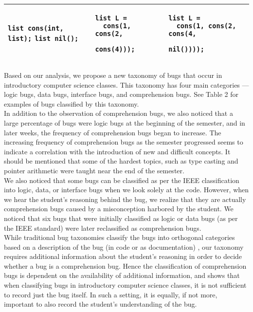 \documentclass{sig-alternate}
\begin{document}
\begin{table*}
\begin{tabular}{|p{0.95in}|p{1.6in}|p{2in}|p{2.1in}|}
\verb|list cons(int, list);|
\verb|list nil();|
& 
\begin{verbatim}
list L = 
  cons(1, cons(2, 
              cons(4)));
\end{verbatim}
& 
\begin{verbatim}
list L = 
  cons(1, cons(2, cons(4, 
                  nil())));
\end{verbatim}
\\ \hline
\end{tabular}
\end{table*}

Based on our analysis, we propose a new taxonomy of bugs that occur in introductory computer science classes. This taxonomy has four main categories --- logic bugs, data bugs, interface bugs, and comprehension bugs. See Table 2 for examples of bugs classified by this taxonomy.\\

In addition to the observation of comprehension bugs, we also noticed that a large percentage of bugs were logic bugs at the beginning of the semester, and in later weeks, the frequency of comprehension bugs began to increase. The increasing frequency of comprehension bugs as the semester progressed seems to indicate a correlation with the introduction of new and difficult concepts. It should be mentioned that some of the hardest topics, such as type casting and pointer arithmetic were taught near the end of the semester.\\

We also noticed that some bugs can be classified as per the IEEE classification into logic, data, or interface bugs when we look solely at the code. However, when we hear the student's reasoning behind the bug, we realize that they are actually comprehension bugs caused by a misconception harbored by the student. We noticed that six bugs that were initially classified as logic or data bugs (as per the IEEE standard) were later reclassified as comprehension bugs.\\

While traditional bug taxonomies classify the bugs into orthogonal categories based on a description of the bug (in code or as documentation) \cite{Beizer90}, our taxonomy requires additional information about the student's reasoning in order to decide whether a bug is a comprehension bug. Hence the classification of comprehension bugs is dependent  on the availability of additional information, and shows that when classifying bugs in introductory computer science classes, it is not sufficient to record just the bug itself. In such a setting, it is equally, if not more, important to also record the student's understanding of the bug.\\
\end{document}
